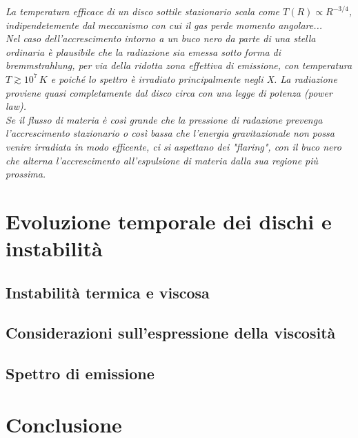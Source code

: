 \documentclass[a4paperbi]{article}
\begin{document}
	\emph{La temperatura efficace di un disco sottile stazionario scala come $T(R)\propto R^{-3/4}$, indipendetemente dal meccanismo con cui il gas perde momento angolare...\\Nel caso dell'accrescimento intorno a un buco nero da parte di una stella ordinaria è plausibile che la radiazione sia emessa sotto forma di bremmstrahlung, per via della ridotta zona effettiva di emissione, con temperatura $T\gtrsim10^7\,K$ e poiché lo spettro è irradiato principalmente negli X. La radiazione proviene quasi completamente dal disco circa con una legge di potenza (\textit{power law}).\\Se il flusso di materia è così grande che la pressione di radazione prevenga l'accrescimento stazionario o così bassa che l'energia gravitazionale non possa venire irradiata in modo efficente, ci si aspettano dei "flaring", con il buco nero che alterna l'accrescimento all'espulsione di materia dalla sua regione più prossima.}
	
\newpage
\section{Evoluzione temporale dei dischi e instabilità}
\subsection{Instabilità termica e viscosa}
\subsection{Considerazioni sull'espressione della viscosità}
\subsection{Spettro di emissione}
\newpage
\section{Conclusione}
\end{document}
